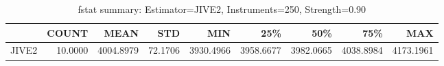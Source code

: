 \begin{table}[ht]
\centering
\caption{fstat summary: Estimator=JIVE2, Instruments=250, Strength=0.90}
\begin{tabular}{lrrrrrrrr}
\toprule
 & COUNT & MEAN & STD & MIN & 25\% & 50\% & 75\% & MAX \\
\midrule
JIVE2 & 10.0000 & 4004.8979 & 72.1706 & 3930.4966 & 3958.6677 & 3982.0665 & 4038.8984 & 4173.1961 \\
\bottomrule
\end{tabular}
\end{table}
